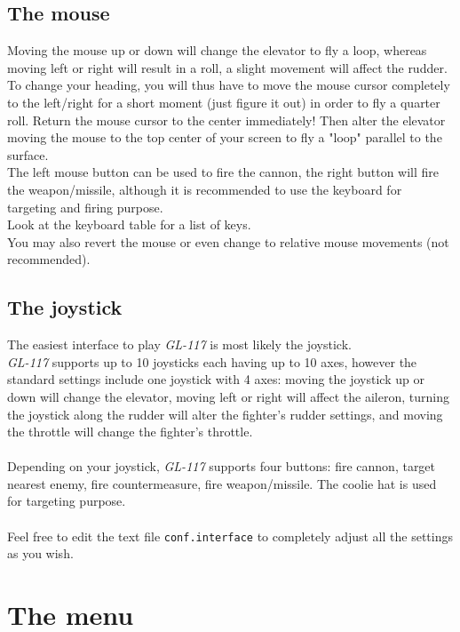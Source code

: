 \subsection{The mouse}
\label{subsec:mouse}

Moving the mouse up or down will change the elevator to fly a loop, whereas
moving left or right will result in a roll, a slight movement will
affect the rudder.\\
To change your heading, you will thus have to move the mouse cursor completely
to the left/right for a short moment (just figure it out) in order to fly a
quarter roll. Return the mouse cursor to the center immediately!
Then alter the elevator moving the mouse to the top center of your screen to
fly a "loop" parallel to the surface.\\
The left mouse button can be used to fire the cannon, the right button will
fire the weapon/missile, although it is recommended to use the keyboard for
targeting and firing purpose.\\
Look at the keyboard table for a list of keys.\\
You may also revert the mouse or even change to relative mouse movements (not recommended).


\subsection{The joystick}
\label{subsec:joystick}

The easiest interface to play \emph{GL-117} is most likely the joystick.\\
\emph{GL-117} supports up to 10 joysticks each having up to 10 axes,
however the standard settings include one joystick with 4 axes:
moving the joystick up or down will change the elevator, moving left or right
will affect the aileron, turning the joystick along the rudder will alter
the fighter's rudder settings, and moving the throttle will change
the fighter's throttle.\\\\
Depending on your joystick, \emph{GL-117} supports four buttons:
fire cannon, target nearest enemy, fire countermeasure, fire weapon/missile.
The coolie hat is used for targeting purpose.\\\\
Feel free to edit the text file \texttt{conf.interface} to completely
adjust all the settings as you wish.


\section{The menu}
\label{sec:menu}

